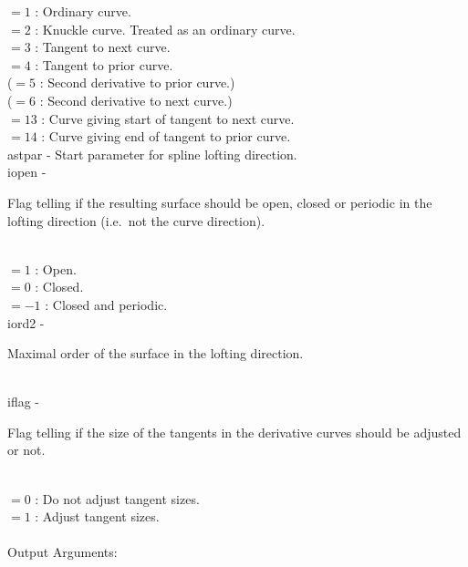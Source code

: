                 \>\>\>\> $=1$ \> : Ordinary curve.\\
                \>\>\>\> $=2$ \> : Knuckle curve. Treated as an ordinary curve.\\
                \>\>\>\> $=3$ \> : Tangent to next curve.\\
                \>\>\>\> $=4$ \> : Tangent to prior curve.\\
                \>\>\>\> ($=5$ \> : Second derivative to prior curve.)\\
                \>\>\>\> ($=6$ \> : Second derivative to next curve.)\\
                \>\>\>\> $=13$ \> : Curve giving start of tangent to next curve.\\
                \>\>\>\> $=14$ \> : Curve giving end of tangent to prior curve.\\
        \>\>    {\fov astpar} \> - \> Start parameter for spline lofting
                                      direction.\\
        \>\>    {\fov iopen} \> - \>
        \begin{minipg2}
          Flag telling if the resulting surface should be open, closed
          or periodic in the lofting direction (i.e.\ not the curve direction).
        \end{minipg2}\\[0.3ex]
        \>\>\>\>  $= 1$ \> : Open.\\
        \>\>\>\>  $= 0$ \> : Closed.\\
        \>\>\>\>  $= -1$ \> : Closed and periodic.\\
        \>\>    {\fov iord2} \> - \>
        \begin{minipg2}
          Maximal order of the surface in the lofting direction.
        \end{minipg2}\\[0.8ex]
\newpagetabs
        \>\>    {\fov iflag} \> - \>
        \begin{minipg2}
          Flag telling if the size of the tangents in the
          derivative curves should be adjusted or not.
        \end{minipg2}\\[0.3ex]
                      \>\>\>\> $= 0$ \> : Do not adjust tangent sizes.\\
                      \>\>\>\> $= 1$ \> : Adjust tangent sizes.\\
\\
        \>Output Arguments:\\
